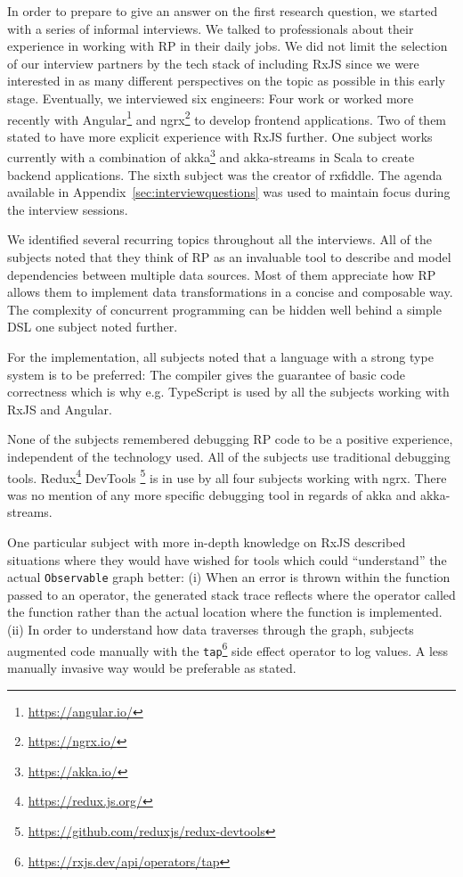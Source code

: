 \documentclass[12pt,a4paper]{article}
\begin{document}
In order to prepare to give an answer on the first research question, we started with a series of informal interviews. We talked to professionals about their experience in working with RP in their daily jobs. We did not limit the selection of our interview partners by the tech stack of including RxJS since we were interested in as many different perspectives on the topic as possible in this early stage. Eventually, we interviewed six engineers: Four work or worked more recently with Angular\footnote{\url{https://angular.io/}} and ngrx\footnote{\url{https://ngrx.io/}} to develop frontend applications. Two of them stated to have more explicit experience with RxJS further. One subject works currently with a combination of akka\footnote{\url{https://akka.io/}} and akka-streams in Scala to create backend applications. The sixth subject was the creator of rxfiddle. The agenda available in Appendix~\ref{sec:interviewquestions} was used to maintain focus during the interview sessions.

We identified several recurring topics throughout all the interviews. All of the subjects noted that they think of RP as an invaluable tool to describe and model dependencies between multiple data sources. Most of them appreciate how RP allows them to implement data transformations in a concise and composable way. The complexity of concurrent programming can be hidden well behind a simple DSL one subject noted further.

For the implementation, all subjects noted that a language with a strong type system is to be preferred: The compiler gives the guarantee of basic code correctness which is why e.g. TypeScript is used by all the subjects working with RxJS and Angular.

None of the subjects remembered debugging RP code to be a positive experience, independent of the technology used. All of the subjects use traditional debugging tools. Redux\footnote{\url{https://redux.js.org/}} DevTools \footnote{\url{https://github.com/reduxjs/redux-devtools}} is in use by all four subjects working with ngrx. There was no mention of any more specific debugging tool in regards of akka and akka-streams.

One particular subject with more in-depth knowledge on RxJS described situations where they would have wished for tools which could ``understand'' the actual \texttt{Observable} graph better: (i) When an error is thrown within the function passed to an operator, the generated stack trace reflects where the operator called the function rather than the actual location where the function is implemented. (ii) In order to understand how data traverses through the graph, subjects augmented code manually with the \texttt{tap}\footnote{\url{https://rxjs.dev/api/operators/tap}} side effect operator to log values. A less manually invasive way would be preferable as stated.
\end{document}
